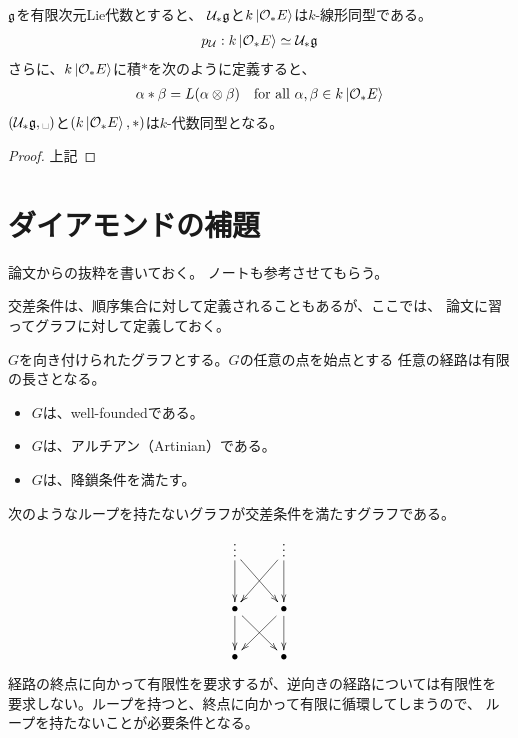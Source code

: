 {	\begin{proposition}[PBWの定理その二]\label{prop:PBWの定理その二} %
		${\mathfrak{g}}$を有限次元Lie代数とすると、
		${{\mathcal{U}}}_*{\mathfrak{g}}$と$k\mathinner{|{{\ensuremath{{\mathcal{O}}}}_*E}\rangle}$は$k$-線形同型である。
		\begin{equation*}\begin{split}
			p_{{\mathcal{U}}}: k\mathinner{|{{\ensuremath{{\mathcal{O}}}}_*E}\rangle} \simeq {\ensuremath{{\mathcal{U}}}}_*{\mathfrak{g}}
		\end{split}\end{equation*}
		さらに、$k\mathinner{|{{\ensuremath{{\mathcal{O}}}}_*E}\rangle}$に積$*$を次のように定義すると、
		\begin{equation*}\begin{split}
			\alpha*\beta = L(\alpha\otimes\beta)
			\quad\text{for all } \alpha,\beta\in k\mathinner{|{{\ensuremath{{\mathcal{O}}}}_*E}\rangle}
		\end{split}\end{equation*}
		$(\U_*\mf{g},\myspace)$と$(k\mathinner{|{{\ensuremath{{\mathcal{O}}}}_*E}\rangle},*)$は$k$-代数同型となる。
	\end{proposition} %
	\begin{proof} 上記
	\end{proof}
\section{ダイアモンドの補題}\label{s1:ダイアモンドの補題} %
	論文\cite{Hevlicek2010Diamond}からの抜粋を書いておく。
	ノート\cite{KhareDiamond}も参考させてもらう。

	交差条件は、順序集合に対して定義されることもあるが、ここでは、
	論文\cite{Hevlicek2010Diamond}に習ってグラフに対して定義しておく。

	\begin{definition}[降鎖条件]\label{def:降鎖条件} %
		$G$を向き付けられたグラフとする。$G$の任意の点を始点とする
		任意の経路は有限の長さとなる。
		\begin{itemize}\setlength{\itemsep}{-1mm} %
			\item $G$は、well-foundedである。
			\item $G$は、アルチアン（Artinian）である。
			\item $G$は、降鎖条件を満たす。
		\end{itemize} %
	\end{definition} %

	次のようなループを持たないグラフが交差条件を満たすグラフである。
	\begin{equation*}\begin{split}
		\xymatrix{
			\vdots \ar[d] \ar[dr] & \vdots \ar[dl] \ar[d] \\
			\bullet \ar[d] \ar[dr] & \bullet \ar[dl] \ar[d] \\
			\bullet & \bullet \\
		}
	\end{split}\end{equation*}
	経路の終点に向かって有限性を要求するが、逆向きの経路については有限性を
	要求しない。ループを持つと、終点に向かって有限に循環してしまうので、
	ループを持たないことが必要条件となる。

}
